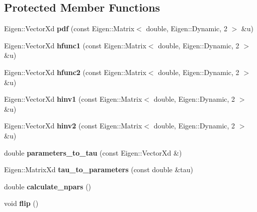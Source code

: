 \subsection*{Protected Member Functions}
\begin{DoxyCompactItemize}
\item 
Eigen\+::\+Vector\+Xd {\bfseries pdf} (const Eigen\+::\+Matrix$<$ double, Eigen\+::\+Dynamic, 2 $>$ \&u)\hypertarget{classvinecopulib_1_1_kernel_bicop_a307624ad91ab1fd38ae7933fab0a5f6a}{}\label{classvinecopulib_1_1_kernel_bicop_a307624ad91ab1fd38ae7933fab0a5f6a}

\item 
Eigen\+::\+Vector\+Xd {\bfseries hfunc1} (const Eigen\+::\+Matrix$<$ double, Eigen\+::\+Dynamic, 2 $>$ \&u)\hypertarget{classvinecopulib_1_1_kernel_bicop_a08a6961d233bc977e583b5253c6089dc}{}\label{classvinecopulib_1_1_kernel_bicop_a08a6961d233bc977e583b5253c6089dc}

\item 
Eigen\+::\+Vector\+Xd {\bfseries hfunc2} (const Eigen\+::\+Matrix$<$ double, Eigen\+::\+Dynamic, 2 $>$ \&u)\hypertarget{classvinecopulib_1_1_kernel_bicop_ae4983795f404cca9c4a6af15d41b104a}{}\label{classvinecopulib_1_1_kernel_bicop_ae4983795f404cca9c4a6af15d41b104a}

\item 
Eigen\+::\+Vector\+Xd {\bfseries hinv1} (const Eigen\+::\+Matrix$<$ double, Eigen\+::\+Dynamic, 2 $>$ \&u)\hypertarget{classvinecopulib_1_1_kernel_bicop_aca726ccdf9a1551fb342dd7e60de1f84}{}\label{classvinecopulib_1_1_kernel_bicop_aca726ccdf9a1551fb342dd7e60de1f84}

\item 
Eigen\+::\+Vector\+Xd {\bfseries hinv2} (const Eigen\+::\+Matrix$<$ double, Eigen\+::\+Dynamic, 2 $>$ \&u)\hypertarget{classvinecopulib_1_1_kernel_bicop_a809dc2c7f0a67d217e0fe9651a625a6b}{}\label{classvinecopulib_1_1_kernel_bicop_a809dc2c7f0a67d217e0fe9651a625a6b}

\item 
double {\bfseries parameters\+\_\+to\+\_\+tau} (const Eigen\+::\+Vector\+Xd \&)\hypertarget{classvinecopulib_1_1_kernel_bicop_a1c00a74e12159b2c06487cf1b3ccff00}{}\label{classvinecopulib_1_1_kernel_bicop_a1c00a74e12159b2c06487cf1b3ccff00}

\item 
Eigen\+::\+Matrix\+Xd {\bfseries tau\+\_\+to\+\_\+parameters} (const double \&tau)\hypertarget{classvinecopulib_1_1_kernel_bicop_a510489f8f985c04c4f692e12ab2d1bf0}{}\label{classvinecopulib_1_1_kernel_bicop_a510489f8f985c04c4f692e12ab2d1bf0}

\item 
double {\bfseries calculate\+\_\+npars} ()\hypertarget{classvinecopulib_1_1_kernel_bicop_a33f736d5f443399f1f4dbe54b386aba3}{}\label{classvinecopulib_1_1_kernel_bicop_a33f736d5f443399f1f4dbe54b386aba3}

\item 
void {\bfseries flip} ()\hypertarget{classvinecopulib_1_1_kernel_bicop_abc23a81271f970b9c99dd6ed727c170f}{}\label{classvinecopulib_1_1_kernel_bicop_abc23a81271f970b9c99dd6ed727c170f}

\end{DoxyCompactItemize}
